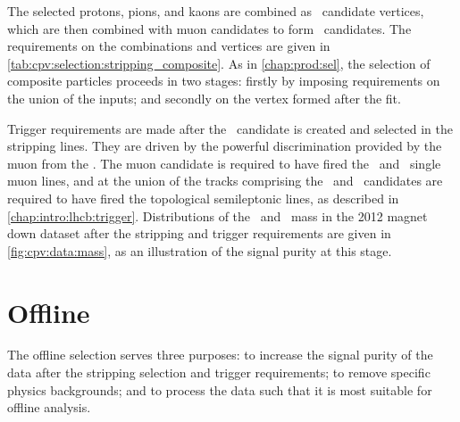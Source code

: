 The selected protons, pions, and kaons are combined as \PLambdac\ candidate 
vertices, which are then combined with muon candidates to form \PLambdab\ 
candidates.
The requirements on the combinations and vertices are given in 
\cref{tab:cpv:selection:stripping_composite}.
As in \cref{chap:prod:sel}, the selection of composite particles proceeds in 
two stages: firstly by imposing requirements on the union of the inputs; and 
secondly on the vertex formed after the fit.

Trigger requirements are made after the \PLambdab\ candidate is created and 
selected in the stripping lines.
They are driven by the powerful discrimination provided by the muon from the 
\PLambdab.
The muon candidate is required to have fired the \lzero\ and \hltone\ single 
muon lines, and at \hlttwo the union of the tracks comprising the \PLambdab\ 
and \PLambdac\ candidates are required to have fired the topological 
semileptonic \PB lines, as described in \cref{chap:intro:lhcb:trigger}.
Distributions of the \pKK\ and \ppipi\ mass in the 2012 magnet down dataset 
after the stripping and trigger requirements are given in 
\cref{fig:cpv:data:mass}, as an illustration of the signal purity at this 
stage.

\begin{table}[bp]
  \centering
  \caption{%
    Selection of tracks, with associated particle hypotheses, used in the 
    \PLambdab\ and \PLambdac\ stripping selection.
    Cuts listed under ``All'' are applied to all tracks.
  }
  \label{tab:cpv:selection:stripping_basic}
  
\end{table}

\begin{table}
  \centering
  \caption{%
    Stripping selection of particle combinations, vertices, and events.
  }
  \label{tab:cpv:selection:stripping_composite}
  
\end{table}

\section{Offline}
\label{chap:cpv:selection:offline}

The offline selection serves three purposes: to increase the signal purity of 
the data after the stripping selection and trigger requirements; to remove 
specific physics backgrounds; and to process the data such that it is most 
suitable for offline analysis.

